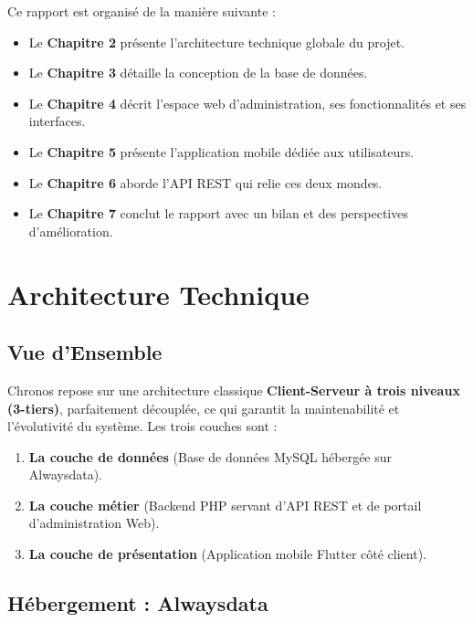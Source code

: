 \documentclass[12pt, a4paper]{report}
\begin{document}
Ce rapport est organisé de la manière suivante :
\begin{itemize}
    \item Le \textbf{Chapitre 2} présente l'architecture technique globale du projet.
    \item Le \textbf{Chapitre 3} détaille la conception de la base de données.
    \item Le \textbf{Chapitre 4} décrit l'espace web d'administration, ses fonctionnalités et ses interfaces.
    \item Le \textbf{Chapitre 5} présente l'application mobile dédiée aux utilisateurs.
    \item Le \textbf{Chapitre 6} aborde l'API REST qui relie ces deux mondes.
    \item Le \textbf{Chapitre 7} conclut le rapport avec un bilan et des perspectives d'amélioration.
\end{itemize}


\chapter{Architecture Technique}

\section{Vue d'Ensemble}

Chronos repose sur une architecture classique \textbf{Client-Serveur à trois niveaux (3-tiers)}, parfaitement découplée, ce qui garantit la maintenabilité et l'évolutivité du système. Les trois couches sont :

\begin{enumerate}
    \item \textbf{La couche de données} (Base de données MySQL hébergée sur Alwaysdata).
    \item \textbf{La couche métier} (Backend PHP servant d'API REST et de portail d'administration Web).
    \item \textbf{La couche de présentation} (Application mobile Flutter côté client).
\end{enumerate}

\section{Hébergement : Alwaysdata}
\end{document}
